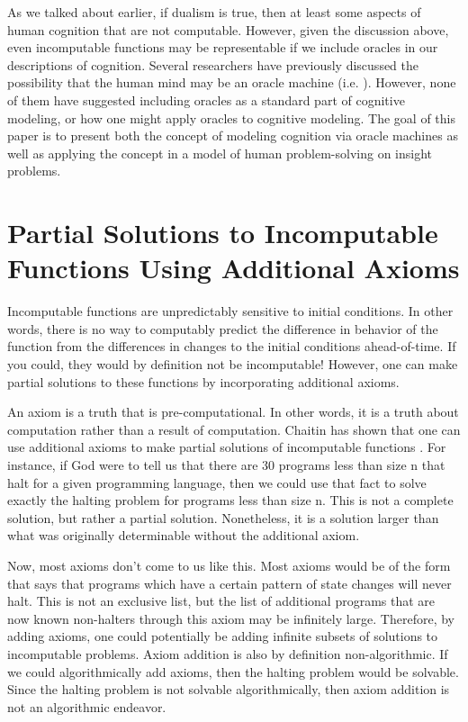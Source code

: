 As we talked about earlier, if dualism is true, then at least some aspects of human cognition that are not computable.  However, given the discussion above, even incomputable functions may be representable if we include oracles in our descriptions of cognition.  Several researchers have previously discussed the possibility that the human mind may be an oracle machine (i.e. \citet{copeland1998}).  However, none of them have suggested including oracles as a standard part of cognitive modeling, or how one might apply oracles to cognitive modeling.\citep{bartlett2010a}\citep{bartlett2010b} The goal of this paper is to present both the concept of modeling cognition via oracle machines as well as applying the concept in a model of human problem-solving on insight problems.

\section[Partial Solutions to Incomputable Functions]{Partial Solutions to Incomputable Functions Using Additional Axioms}

Incomputable functions are unpredictably sensitive to initial conditions.  In other words, there is no way to computably predict the difference in behavior of the function from the differences in changes to the initial conditions ahead-of-time.  If you could, they would by definition not be incomputable!  However, one can make partial solutions to these functions by incorporating additional axioms.

An axiom is a truth that is pre-computational.  In other words, it is a truth about computation rather than a result of computation.  Chaitin has shown that one can use additional axioms to make partial solutions of incomputable functions \citep{chaitin1982}.  For instance, if God were to tell us that there are 30 programs less than size n that halt for a given programming language, then we could use that fact to solve exactly the halting problem for programs less than size n.  This is not a complete solution, but rather a partial solution.  Nonetheless, it is a solution larger than what was originally determinable without the additional axiom.

Now, most axioms don't come to us like this.  Most axioms would be of the form that says that programs which have a certain pattern of state changes will never halt.  This is not an exclusive list, but the list of additional programs that are now known non-halters through this axiom may be infinitely large.  Therefore, by adding axioms, one could potentially be adding infinite subsets of solutions to incomputable problems.  Axiom addition is also by definition non-algorithmic.  If we could algorithmically add axioms, then the halting problem would be solvable.  Since the halting problem is not solvable algorithmically, then axiom addition is not an algorithmic endeavor.

